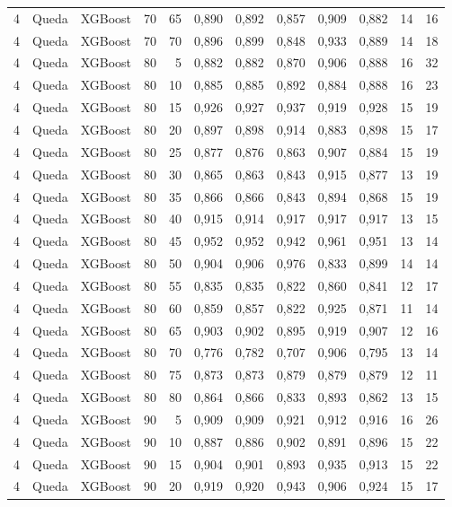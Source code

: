 \begin{longtable}{@{}rllrrrrrrrrr@{}}
4 & Queda & XGBoost & 70 & 65 & 0,890 & 0,892 & 0,857 & 0,909 & 0,882 & 14 & 16 \\
4 & Queda & XGBoost & 70 & 70 & 0,896 & 0,899 & 0,848 & 0,933 & 0,889 & 14 & 18 \\
4 & Queda & XGBoost & 80 & 5 & 0,882 & 0,882 & 0,870 & 0,906 & 0,888 & 16 & 32 \\
4 & Queda & XGBoost & 80 & 10 & 0,885 & 0,885 & 0,892 & 0,884 & 0,888 & 16 & 23 \\
4 & Queda & XGBoost & 80 & 15 & 0,926 & 0,927 & 0,937 & 0,919 & 0,928 & 15 & 19 \\
4 & Queda & XGBoost & 80 & 20 & 0,897 & 0,898 & 0,914 & 0,883 & 0,898 & 15 & 17 \\
4 & Queda & XGBoost & 80 & 25 & 0,877 & 0,876 & 0,863 & 0,907 & 0,884 & 15 & 19 \\
4 & Queda & XGBoost & 80 & 30 & 0,865 & 0,863 & 0,843 & 0,915 & 0,877 & 13 & 19 \\
4 & Queda & XGBoost & 80 & 35 & 0,866 & 0,866 & 0,843 & 0,894 & 0,868 & 15 & 19 \\
4 & Queda & XGBoost & 80 & 40 & 0,915 & 0,914 & 0,917 & 0,917 & 0,917 & 13 & 15 \\
4 & Queda & XGBoost & 80 & 45 & 0,952 & 0,952 & 0,942 & 0,961 & 0,951 & 13 & 14 \\
4 & Queda & XGBoost & 80 & 50 & 0,904 & 0,906 & 0,976 & 0,833 & 0,899 & 14 & 14 \\
4 & Queda & XGBoost & 80 & 55 & 0,835 & 0,835 & 0,822 & 0,860 & 0,841 & 12 & 17 \\
4 & Queda & XGBoost & 80 & 60 & 0,859 & 0,857 & 0,822 & 0,925 & 0,871 & 11 & 14 \\
4 & Queda & XGBoost & 80 & 65 & 0,903 & 0,902 & 0,895 & 0,919 & 0,907 & 12 & 16 \\
4 & Queda & XGBoost & 80 & 70 & 0,776 & 0,782 & 0,707 & 0,906 & 0,795 & 13 & 14 \\
4 & Queda & XGBoost & 80 & 75 & 0,873 & 0,873 & 0,879 & 0,879 & 0,879 & 12 & 11 \\
4 & Queda & XGBoost & 80 & 80 & 0,864 & 0,866 & 0,833 & 0,893 & 0,862 & 13 & 15 \\
4 & Queda & XGBoost & 90 & 5 & 0,909 & 0,909 & 0,921 & 0,912 & 0,916 & 16 & 26 \\
4 & Queda & XGBoost & 90 & 10 & 0,887 & 0,886 & 0,902 & 0,891 & 0,896 & 15 & 22 \\
4 & Queda & XGBoost & 90 & 15 & 0,904 & 0,901 & 0,893 & 0,935 & 0,913 & 15 & 22 \\
4 & Queda & XGBoost & 90 & 20 & 0,919 & 0,920 & 0,943 & 0,906 & 0,924 & 15 & 17 \\

\end{longtable}
